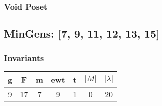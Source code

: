 \documentclass[a4paper]{article}
\begin{document}
\hfill\begin{minipage}{0.48\textwidth}
\subsubsection*{Void Poset}
\centering
{}
\end{minipage}
\newpage\subsection{MinGens: [7, 9, 11, 12, 13, 15]}
\noindent\begin{minipage}{0.6\textwidth}
\subsubsection*{Invariants}
\centering
\begin{tabular}{|c|c|c|c|c|c|c|}
\toprule
g & F & m & ewt & t & \(|M|\) & \(|\lambda|\) \\
\midrule
9 & 17 & 7 & 9 & 1 & 0 & 20 \\
\bottomrule
\end{tabular}
\end{minipage}%
\end{document}
